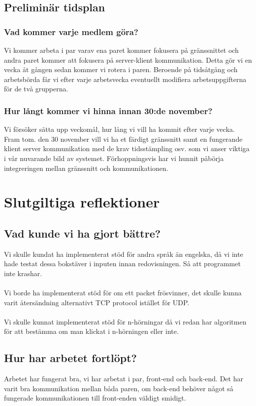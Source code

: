 \documentclass[a4paper]{article}
\begin{document}
\subsection{Preliminär tidsplan}
\subsubsection{Vad kommer varje medlem göra?}
Vi kommer arbeta i par varav ena paret kommer fokusera på gränssnittet och andra paret kommer att fokusera på server-klient kommunikation. Detta gör vi en vecka åt gången sedan kommer vi rotera i paren. Beroende på tidsåtgång och arbetsbörda får vi efter varje arbetsvecka eventuellt modifiera arbetsuppgifterna för de två grupperna.
\subsubsection{Hur långt kommer vi hinna innan 30:de november?}
Vi försöker sätta upp veckomål, hur lång vi vill ha kommit efter varje vecka. Fram tom. den 30 november vill vi ha et färdigt gränssnitt samt en fungerande klient server kommunikation med de krav tidsstämpling osv. som vi anser viktiga i vår nuvarande bild av systemet. Förhoppningsvis har vi hunnit påbörja integreringen mellan gränssnitt och kommunikationen.

\newpage

\section{Slutgiltiga reflektioner}

\subsection{Vad kunde vi ha gjort bättre?}
Vi skulle kundat ha implementerat stöd för andra språk än engelska, då vi inte hade testat dessa bokstäver i inputen innan redovisningen. Så att programmet inte krashar.\\
\\
Vi borde ha implementerat stöd för om ett packet frösvinner, det skulle kunna varit återsändning alternativt TCP protocol istället för UDP.\\
\\
Vi skulle kunnat implementerat stöd för n-hörningar då vi redan har algoritmen för att bestämma om man klickat i n-hörningen eller inte.

\subsection{Hur har arbetet fortlöpt?}
Arbetet har fungerat bra, vi har arbetat i par, front-end och back-end.
Det har varit bra kommunikation mellan båda paren, om back-end behöver något så fungerade kommunikationen till front-enden väldigt smidigt.
\end{document}

